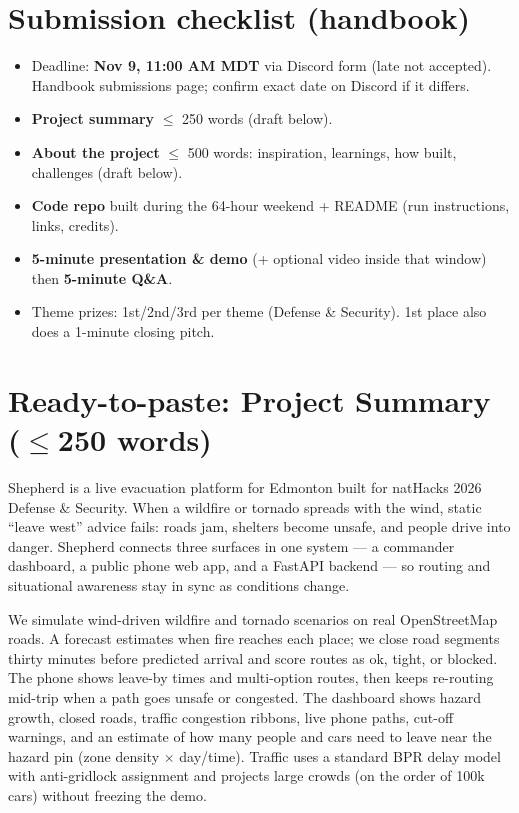 \documentclass[10pt]{extarticle}
\begin{document}
\section{Submission checklist (handbook)}
\begin{itemize}
\item Deadline: \textbf{Nov 9, 11:00 AM MDT} via Discord form (late not accepted). Handbook submissions page; confirm exact date on Discord if it differs.
\item \textbf{Project summary} $\le$ 250 words (draft below).
\item \textbf{About the project} $\le$ 500 words: inspiration, learnings, how built, challenges (draft below).
\item \textbf{Code repo} built during the 64-hour weekend + README (run instructions, links, credits).
\item \textbf{5-minute presentation \& demo} (+ optional video inside that window) then \textbf{5-minute Q\&A}.
\item Theme prizes: 1st/2nd/3rd per theme (Defense \& Security). 1st place also does a 1-minute closing pitch.
\end{itemize}

\section{Ready-to-paste: Project Summary ($\le$250 words)}
Shepherd is a live evacuation platform for Edmonton built for natHacks 2026 Defense \& Security. When a wildfire or tornado spreads with the wind, static ``leave west'' advice fails: roads jam, shelters become unsafe, and people drive into danger. Shepherd connects three surfaces in one system --- a commander dashboard, a public phone web app, and a FastAPI backend --- so routing and situational awareness stay in sync as conditions change.

We simulate wind-driven wildfire and tornado scenarios on real OpenStreetMap roads. A forecast estimates when fire reaches each place; we close road segments thirty minutes before predicted arrival and score routes as ok, tight, or blocked. The phone shows leave-by times and multi-option routes, then keeps re-routing mid-trip when a path goes unsafe or congested. The dashboard shows hazard growth, closed roads, traffic congestion ribbons, live phone paths, cut-off warnings, and an estimate of how many people and cars need to leave near the hazard pin (zone density $\times$ day/time). Traffic uses a standard BPR delay model with anti-gridlock assignment and projects large crowds (on the order of 100k cars) without freezing the demo.
\end{document}
